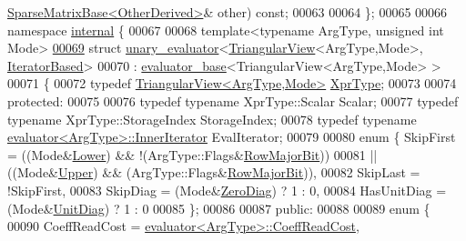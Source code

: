 \begin{DoxyCode}
      \hyperlink{group___sparse_core___module_class_eigen_1_1_sparse_matrix_base}{SparseMatrixBase<OtherDerived>}& other) \textcolor{keyword}{const};
00063   
00064 \};
00065 
00066 \textcolor{keyword}{namespace }\hyperlink{namespaceinternal}{internal} \{
00067 
00068 \textcolor{keyword}{template}<\textcolor{keyword}{typename} ArgType, \textcolor{keywordtype}{unsigned} \textcolor{keywordtype}{int} Mode>
\hyperlink{struct_eigen_1_1internal_1_1unary__evaluator_3_01_triangular_view_3_01_arg_type_00_01_mode_01_4_00_01_iterator_based_01_4}{00069} \textcolor{keyword}{struct }\hyperlink{struct_eigen_1_1internal_1_1unary__evaluator}{unary\_evaluator}<\hyperlink{group___core___module_class_eigen_1_1_triangular_view}{TriangularView}<ArgType,Mode>, 
      \hyperlink{struct_eigen_1_1internal_1_1_iterator_based}{IteratorBased}>
00070  : \hyperlink{struct_eigen_1_1internal_1_1evaluator__base}{evaluator\_base}<TriangularView<ArgType,Mode> >
00071 \{
00072   \textcolor{keyword}{typedef} \hyperlink{group___core___module_class_eigen_1_1_triangular_view}{TriangularView<ArgType,Mode>} \hyperlink{group___core___module_class_eigen_1_1_triangular_view}{XprType};
00073   
00074 \textcolor{keyword}{protected}:
00075   
00076   \textcolor{keyword}{typedef} \textcolor{keyword}{typename} XprType::Scalar Scalar;
00077   \textcolor{keyword}{typedef} \textcolor{keyword}{typename} XprType::StorageIndex StorageIndex;
00078   \textcolor{keyword}{typedef} \textcolor{keyword}{typename} \hyperlink{struct_eigen_1_1internal_1_1evaluator}{evaluator<ArgType>::InnerIterator} EvalIterator;
00079   
00080   \textcolor{keyword}{enum} \{ SkipFirst = ((Mode&\hyperlink{group__enums_gga39e3366ff5554d731e7dc8bb642f83cda891792b8ed394f7607ab16dd716f60e6}{Lower}) && !(ArgType::Flags&\hyperlink{group__flags_gae4f56c2a60bbe4bd2e44c5b19cbe8762}{RowMajorBit}))
00081                     || ((Mode&\hyperlink{group__enums_gga39e3366ff5554d731e7dc8bb642f83cda6bcb58be3b8b8ec84859ce0c5ac0aaec}{Upper}) &&  (ArgType::Flags&\hyperlink{group__flags_gae4f56c2a60bbe4bd2e44c5b19cbe8762}{RowMajorBit})),
00082          SkipLast = !SkipFirst,
00083          SkipDiag = (Mode&\hyperlink{group__enums_gga39e3366ff5554d731e7dc8bb642f83cda884ff7240392e85aa6e4b3c957e36483}{ZeroDiag}) ? 1 : 0,
00084          HasUnitDiag = (Mode&\hyperlink{group__enums_gga39e3366ff5554d731e7dc8bb642f83cdaddb72f888ac85d5a1c52333e54f9374b}{UnitDiag}) ? 1 : 0
00085   \};
00086   
00087 \textcolor{keyword}{public}:
00088   
00089   \textcolor{keyword}{enum} \{
00090     CoeffReadCost = \hyperlink{struct_eigen_1_1internal_1_1evaluator}{evaluator<ArgType>::CoeffReadCost},

\end{DoxyCode}
